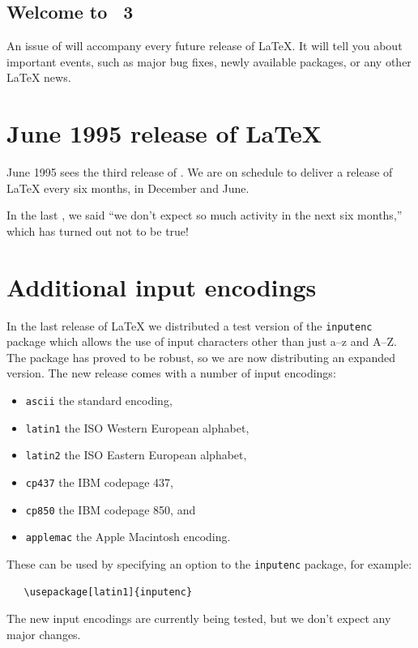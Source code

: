 \documentclass{ltnews}
\providecommand\pkg[1]{\texttt{#1}}
\providecommand\option[1]{\texttt{#1}}
\begin{document}
\maketitle

\subsection{Welcome to \LaTeXNews~3}

An issue of \emph{\LaTeXNews} will accompany every future release of
\LaTeX.  It will tell you about important events, such as major bug
fixes, newly available packages, or any other \LaTeX{} news.

\section{June 1995 release of \LaTeX}

June 1995 sees the third release of \LaTeXe.  We are on schedule
to deliver a release of \LaTeX{} every six months, in December and
June.

In the last \emph{\LaTeXNews}, we said ``we don't expect so much
activity in the next six months,'' which has turned out not to be
true!

\section{Additional input encodings}

In the last release of \LaTeX{} we distributed a test version of the
\pkg{inputenc} package which allows the use of input characters
other than just a--z and A--Z.  The package has proved to be robust,
so we are now distributing an expanded version.
The new release comes with a number of input encodings:

\begin{itemize}
\item \option{ascii} the standard encoding,
\item \option{latin1} the ISO Western European alphabet,
\item \option{latin2} the ISO Eastern European alphabet,
\item \option{cp437} the IBM codepage 437,
\item \option{cp850} the IBM codepage 850, and
\item \option{applemac} the Apple Macintosh encoding.
\end{itemize}
These can be used by specifying an option to the \pkg{inputenc}
package, for example:
\begin{verbatim}
   \usepackage[latin1]{inputenc}
\end{verbatim}
The new input encodings are currently being tested, but we don't
expect any major changes.
\end{document}
